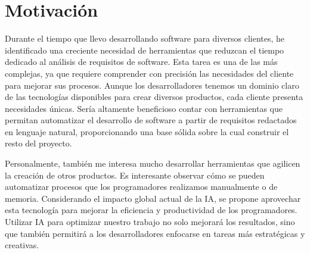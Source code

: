 \section{Motivación}\label{section:motivacion}

Durante el tiempo que llevo desarrollando software para diversos clientes, he identificado una creciente necesidad de herramientas que reduzcan el tiempo dedicado al análisis de requisitos de software. Esta tarea es una de las más complejas, ya que requiere comprender con precisión las necesidades del cliente para mejorar sus procesos. Aunque los desarrolladores tenemos un dominio claro de las tecnologías disponibles para crear diversos productos, cada cliente presenta necesidades únicas. Sería altamente beneficioso contar con herramientas que permitan automatizar el desarrollo de software a partir de requisitos redactados en lenguaje natural, proporcionando una base sólida sobre la cual construir el resto del proyecto.

Personalmente, también me interesa mucho desarrollar herramientas que agilicen la creación de otros productos. Es interesante observar cómo se pueden automatizar procesos que los programadores realizamos manualmente o de memoria. Considerando el impacto global actual de la IA, se propone aprovechar esta tecnología para mejorar la eficiencia y productividad de los programadores. Utilizar IA para optimizar nuestro trabajo no solo mejorará los resultados, sino que también permitirá a los desarrolladores enfocarse en tareas más estratégicas y creativas.